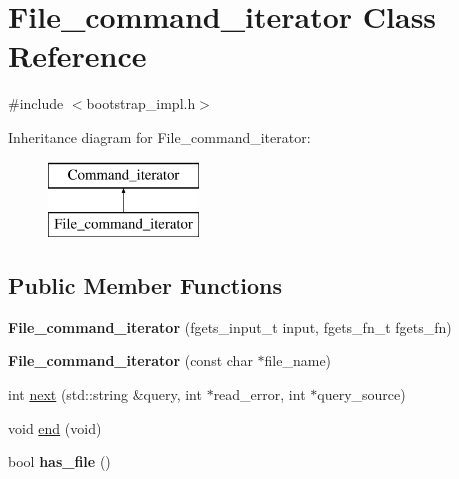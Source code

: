 \hypertarget{classFile__command__iterator}{}\section{File\+\_\+command\+\_\+iterator Class Reference}
\label{classFile__command__iterator}


{\ttfamily \#include $<$bootstrap\+\_\+impl.\+h$>$}

Inheritance diagram for File\+\_\+command\+\_\+iterator\+:\begin{figure}[H]
\begin{center}
\leavevmode
\includegraphics[height=2.000000cm]{classFile__command__iterator}
\end{center}
\end{figure}
\subsection*{Public Member Functions}
\begin{DoxyCompactItemize}
\item 
\mbox{\label{classFile__command__iterator_a1438f925113adef2c2d1f5855f0a6869}} 
{\bfseries File\+\_\+command\+\_\+iterator} (fgets\+\_\+input\+\_\+t input, fgets\+\_\+fn\+\_\+t fgets\+\_\+fn)
\item 
\mbox{\label{classFile__command__iterator_a58373a843a9019cd442a9f3a8e3e4af0}} 
{\bfseries File\+\_\+command\+\_\+iterator} (const char $\ast$file\+\_\+name)
\item 
int \mbox{\hyperlink{classFile__command__iterator_a62064b6e416813b4f998a3ac654b6f5f}{next}} (std\+::string \&query, int $\ast$read\+\_\+error, int $\ast$query\+\_\+source)
\item 
void \mbox{\hyperlink{classFile__command__iterator_ad12ce1809b043f8966fcab2e70e1a1dd}{end}} (void)
\item 
\mbox{\label{classFile__command__iterator_a302d0158f8f50096d67fa2a5b206a2c3}} 
bool {\bfseries has\+\_\+file} ()
\end{DoxyCompactItemize}
